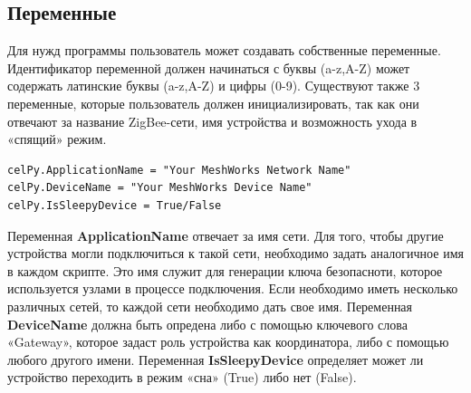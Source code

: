 \documentclass[12pt]{article}
\begin{document}
\subsection{Переменные}
Для нужд программы пользователь может создавать собственные переменные. 
Идентификатор переменной должен начинаться с буквы (a-z,A-Z) может содержать 
латинские буквы (a-z,A-Z) и цифры (0-9).
Существуют также 3 переменные, которые пользователь должен инициализировать, так 
как они отвечают за название ZigBee-сети, имя устройства и возможность ухода в 
«спящий» режим.
\begin{verbatim}
celPy.ApplicationName = "Your MeshWorks Network Name"
celPy.DeviceName = "Your MeshWorks Device Name"
celPy.IsSleepyDevice = True/False
\end{verbatim}
Переменная \textbf{ApplicationName} отвечает за имя сети. Для того, чтобы другие 
устройства могли подключиться к такой сети, необходимо задать аналогичное имя в 
каждом скрипте. Это имя служит для генерации ключа безопасноти, которое используется 
узлами в процессе подключения. Если необходимо иметь несколько различных сетей, 
то каждой сети необходимо дать свое имя.
Переменная \textbf{DeviceName} должна быть опредена либо с помощью ключевого 
слова «Gateway», которое задаст роль устройства как координатора, либо с помощью 
любого другого имени.
Переменная \textbf{IsSleepyDevice} определяет может ли устройство переходить в 
режим «сна» (True) либо нет (False).
\end{document}

